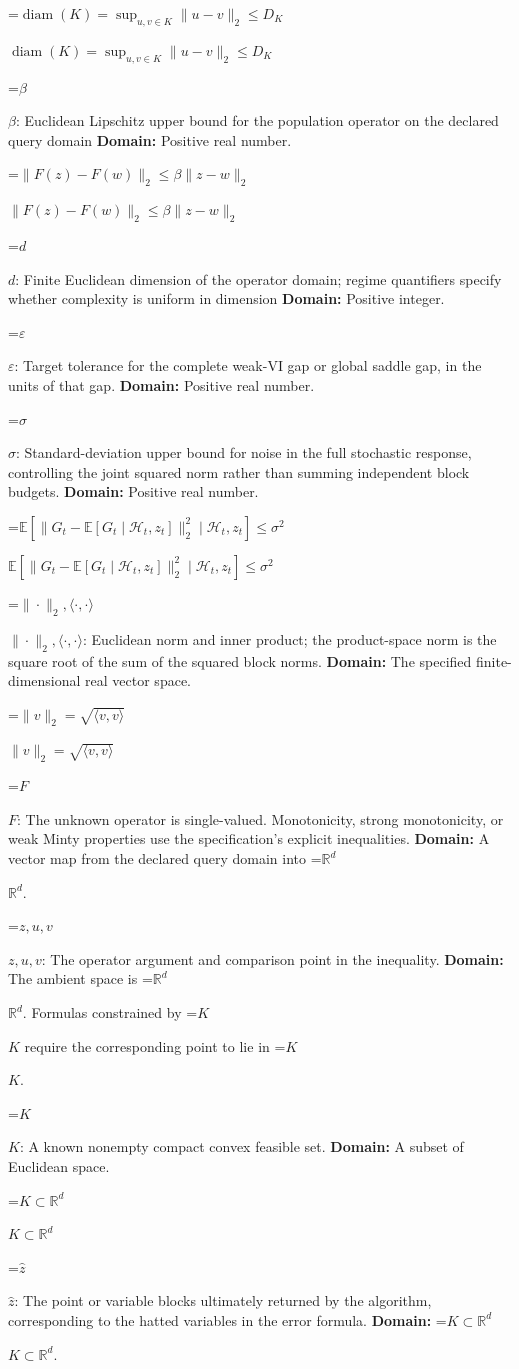 \documentclass[10pt,a4paper]{article}
\newcommand{\AtlasMath}[1]{\par\begingroup\centering\setbox0=\hbox{$\displaystyle #1$}\ifdim\wd0>1.4\linewidth\typeout{ATLAS WIDE FORMULA: \the\wd0}\fi\ifdim\wd0>\linewidth\resizebox{\linewidth}{!}{\box0}\else\box0\fi\par\endgroup}
\newcommand{\AtlasInlineMath}[1]{\begingroup\setbox0=\hbox{$#1$}\ifdim\wd0>.4\linewidth\endgroup\AtlasMath{#1}\else\endgroup$#1$\fi}
\begin{document}
\AtlasInlineMath{\operatorname{diam}(K)=\sup_{u,v\in K}\|u-v\|_2\le D_K}

\AtlasInlineMath{\beta}: Euclidean Lipschitz upper bound for the population operator on the declared query domain \textbf{Domain:} Positive real number.

\AtlasInlineMath{\|F(z)-F(w)\|_2\le\beta\|z-w\|_2}

\AtlasInlineMath{d}: Finite Euclidean dimension of the operator domain; regime quantifiers specify whether complexity is uniform in dimension \textbf{Domain:} Positive integer.

\AtlasInlineMath{\varepsilon}: Target tolerance for the complete weak-VI gap or global saddle gap, in the units of that gap. \textbf{Domain:} Positive real number.

\AtlasInlineMath{\sigma}: Standard-deviation upper bound for noise in the full stochastic response, controlling the joint squared norm rather than summing independent block budgets. \textbf{Domain:} Positive real number.

\AtlasInlineMath{\mathbb E[\|G_t-\mathbb E[G_t\mid\mathcal H_t,z_t]\|_2^2\mid\mathcal H_t,z_t]\le\sigma^2}

\AtlasInlineMath{\|\cdot\|_2,\langle\cdot,\cdot\rangle}: Euclidean norm and inner product; the product-space norm is the square root of the sum of the squared block norms. \textbf{Domain:} The specified finite-dimensional real vector space.

\AtlasInlineMath{\|v\|_2=\sqrt{\langle v,v\rangle}}

\AtlasInlineMath{F}: The unknown operator is single-valued. Monotonicity, strong monotonicity, or weak Minty properties use the specification’s explicit inequalities. \textbf{Domain:} A vector map from the declared query domain into \AtlasInlineMath{\mathbb R^d}.

\AtlasInlineMath{z,u,v}: The operator argument and comparison point in the inequality. \textbf{Domain:} The ambient space is \AtlasInlineMath{\mathbb R^d}. Formulas constrained by \AtlasInlineMath{K} require the corresponding point to lie in \AtlasInlineMath{K}.

\AtlasInlineMath{K}: A known nonempty compact convex feasible set. \textbf{Domain:} A subset of Euclidean space.

\AtlasInlineMath{K\subset\mathbb R^d}

\AtlasInlineMath{\widehat z}: The point or variable blocks ultimately returned by the algorithm, corresponding to the hatted variables in the error formula. \textbf{Domain:} \AtlasInlineMath{K\subset\mathbb R^d}.
\end{document}
